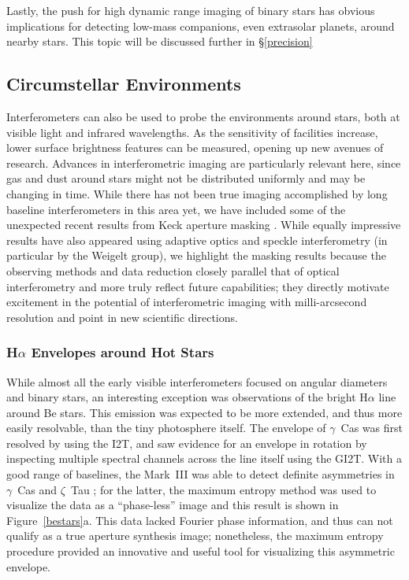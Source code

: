 \documentclass[12pt]{article}
\begin{document}
Lastly, the push for high dynamic range imaging of binary stars
has obvious implications for detecting low-mass companions, even 
extrasolar planets, around nearby stars.  This topic will be discussed further
in \S\ref{precision}

\subsection{Circumstellar Environments}

Interferometers can also be used to probe the environments around
stars, both at visible light and infrared wavelengths.  As the
sensitivity of facilities increase, lower surface brightness features
can be measured, opening up new avenues of research.  Advances in
interferometric imaging are particularly relevant here, since gas and
dust around stars might not be distributed uniformly and may be
changing in time.  While there has not been true imaging accomplished
by long baseline interferometers in this area yet, we have included
some of the unexpected recent results from Keck aperture masking
\citep{tuthill2000}.  While equally impressive results have also
appeared using adaptive optics and speckle interferometry (in
particular by the Weigelt group), we highlight the masking results
because the observing methods and data reduction closely parallel that
of optical interferometry and more truly reflect future capabilities;
they directly motivate excitement in the potential of interferometric
imaging with milli-arcsecond resolution and point in new scientific
directions.


\subsubsection{H$\alpha$ Envelopes around Hot Stars}
\label{halpha}
While almost all the early visible interferometers focused on angular
diameters and binary stars, an interesting exception was observations
of the bright H$\alpha$ line around Be stars.  This emission was
expected to be more extended, and thus more easily resolvable, than
the tiny photosphere itself.  The envelope of $\gamma$~Cas was first
resolved by \citet{thom1986} using the I2T, and \citet{mourard1989}
saw evidence for an envelope in rotation by inspecting multiple
spectral channels across the line itself using the GI2T.  With a good
range of baselines, the Mark~III was able to detect definite
asymmetries in $\gamma$~Cas and $\zeta$~Tau
\citep{quirrenbach1993b,quirrenbach1994}; for the latter, the maximum
entropy method was used to visualize the data as a ``phase-less''
image and this result is shown in Figure~\ref{bestars}a.  This data
lacked Fourier phase information, and thus can not qualify as a true
aperture synthesis image; nonetheless, the maximum entropy procedure
provided an innovative and useful tool for visualizing this asymmetric
envelope.
\end{document}
